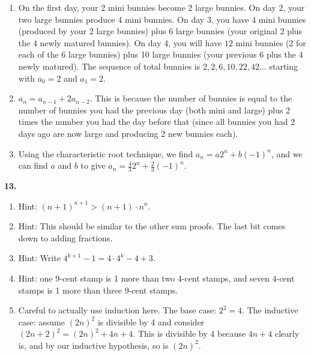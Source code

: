 \documentclass[10pt,]{book}
\theoremstyle{plain}
\theoremstyle{definition}
\theoremstyle{definition}
\theoremstyle{definition}
\numberwithin{equation}{chapter}
\begin{document}
\begin{enumerate}[label=(\alph*)]
\item\hypertarget{li-1000}{}
                On the first day, your 2 mini bunnies become 2 large bunnies. On day 2, your two large bunnies produce 4 mini bunnies. On day 3, you have 4 mini bunnies (produced by your 2 large bunnies) plus 6 large bunnies (your original 2 plus the 4 newly matured bunnies). On day 4, you will have \(12\) mini bunnies (2 for each of the 6 large bunnies) plus 10 large bunnies (your previous 6 plus the 4 newly matured). The sequence of total bunnies is \(2, 2, 6, 10, 22, 42\ldots\) starting with \(a_0 = 2\) and \(a_1 = 2\).
\item\hypertarget{li-1001}{}\(a_n = a_{n-1} + 2a_{n-2}\). This is because the number of bunnies is equal to the number of bunnies you had the previous day (both mini and large) plus 2 times the number you had the day before that (since all bunnies you had 2 days ago are now large and producing 2 new bunnies each).%
\item\hypertarget{li-1002}{}
                Using the characteristic root technique, we find \(a_n = a2^n + b(-1)^n\), and we can find \(a\) and \(b\) to give \(a_n = \frac{4}{3}2^n + \frac{2}{3}(-1)^n\).
\end{enumerate}
\par\smallskip
\noindent\textbf{13.}\quad{}\leavevmode%
\begin{enumerate}[label=(\alph*)]
\item\hypertarget{li-1008}{}
                Hint: \((n+1)^{n+1} > (n+1) \cdot n^{n}\).
\item\hypertarget{li-1009}{}
                Hint: This should be similar to the other sum proofs. The last bit comes down to adding fractions.
\item\hypertarget{li-1010}{}
                Hint: Write \(4^{k+1} - 1 = 4\cdot 4^k - 4 + 3\).
\item\hypertarget{li-1011}{}
                Hint: one 9-cent stamp is 1 more than two 4-cent stamps, and seven 4-cent stamps is 1 more than three 9-cent stamps.
\item\hypertarget{li-1012}{}
                Careful to actually use induction here. The base case: \(2^2 = 4\). The inductive case: assume \((2n)^2\) is divisible by 4 and consider \((2n+2)^2 = (2n)^2 + 4n + 4\). This is divisible by 4 because \(4n +4\) clearly is, and by our inductive hypothesis, so is \((2n)^2\).
\end{enumerate}
\end{document}
